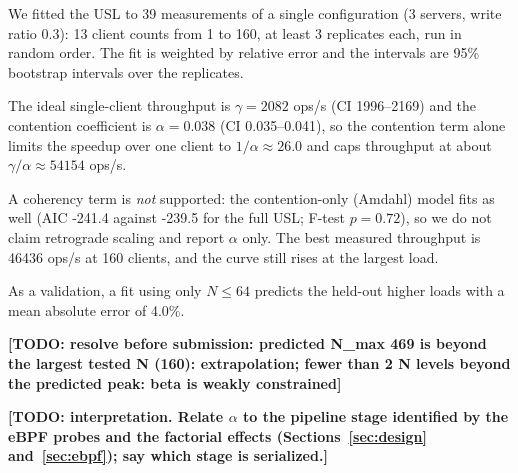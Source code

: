 We fitted the USL to 39 measurements of a single configuration (3 servers, write ratio 0.3): 13 client counts from 1 to 160, at least 3 replicates each, run in random order. The fit is weighted by relative error and the intervals are 95\% bootstrap intervals over the replicates.

The ideal single-client throughput is $\gamma=2082$ ops/s (CI 1996--2169) and the contention coefficient is $\alpha=0.038$ (CI 0.035--0.041), so the contention term alone limits the speedup over one client to $1/\alpha\approx26.0$ and caps throughput at about $\gamma/\alpha\approx54154$ ops/s.

A coherency term is \emph{not} supported: the contention-only (Amdahl) model fits as well (AIC -241.4 against -239.5 for the full USL; F-test $p=0.72$), so we do not claim retrograde scaling and report $\alpha$ only. The best measured throughput is 46436 ops/s at 160 clients, and the curve still rises at the largest load.

As a validation, a fit using only $N\le64$ predicts the held-out higher loads with a mean absolute error of 4.0\%.

\textbf{[TODO: resolve before submission: predicted N\_max 469 is beyond the largest tested N (160): extrapolation; fewer than 2 N levels beyond the predicted peak: beta is weakly constrained]}

\textbf{[TODO: interpretation. Relate $\alpha$ to the pipeline stage identified by the eBPF probes and the factorial effects (Sections~\ref{sec:design} and~\ref{sec:ebpf}); say which stage is serialized.]}
